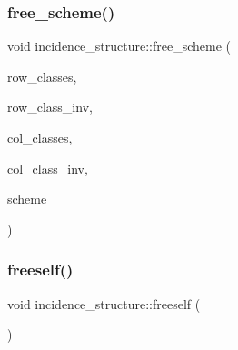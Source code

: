 \subsubsection{\texorpdfstring{free\+\_\+scheme()}{free\_scheme()}}
{\footnotesize\ttfamily void incidence\+\_\+structure\+::free\+\_\+scheme (\begin{DoxyParamCaption}\item[{\mbox{\hyperlink{galois_8h_a09fddde158a3a20bd2dcadb609de11dc}{I\+NT}} $\ast$}]{row\+\_\+classes,  }\item[{\mbox{\hyperlink{galois_8h_a09fddde158a3a20bd2dcadb609de11dc}{I\+NT}} $\ast$}]{row\+\_\+class\+\_\+inv,  }\item[{\mbox{\hyperlink{galois_8h_a09fddde158a3a20bd2dcadb609de11dc}{I\+NT}} $\ast$}]{col\+\_\+classes,  }\item[{\mbox{\hyperlink{galois_8h_a09fddde158a3a20bd2dcadb609de11dc}{I\+NT}} $\ast$}]{col\+\_\+class\+\_\+inv,  }\item[{\mbox{\hyperlink{galois_8h_a09fddde158a3a20bd2dcadb609de11dc}{I\+NT}} $\ast$}]{scheme }\end{DoxyParamCaption})}

\mbox{\label{classincidence__structure_a2c962871ee384bccc46d9dbd8c3eea93}} 
\subsubsection{\texorpdfstring{freeself()}{freeself()}}
{\footnotesize\ttfamily void incidence\+\_\+structure\+::freeself (\begin{DoxyParamCaption}{ }\end{DoxyParamCaption})}

\mbox{\label{classincidence__structure_a0c51e7224f51f1434025ff6d8a10522c}} 
